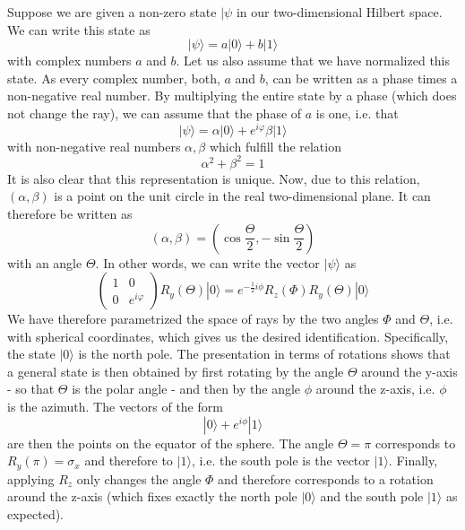 \documentclass[a4paper, draft]{article}
\theoremstyle{own}
\theoremstyle{remark}
\begin{document}
Suppose we are given a non-zero state $|\psi$ in our two-dimensional Hilbert space. We can write this state as
$$
|\psi \rangle = a |0 \rangle + b |1 \rangle
$$
with complex numbers $a$ and $b$. Let us also assume that we have normalized this state. As every complex number, both, $a$ and $b$, can be written as a phase times a non-negative real number. By multiplying the entire state by a phase (which does not change the ray), we can assume that the phase of $a$ is one, i.e. that
$$
|\psi \rangle = \alpha |0 \rangle + e^{i\varphi} \beta |1 \rangle
$$
with non-negative real numbers $\alpha, \beta$ which fulfill the relation
$$
\alpha^2 + \beta^2 = 1
$$
It is also clear that this representation is unique. Now, due to this relation, $(\alpha, \beta)$ is a point on the unit circle in the real two-dimensional plane. It can therefore be written as
$$
(\alpha, \beta) = (\cos \frac{\Theta}{2}, - \sin \frac{\Theta}{2})
$$
with an angle $\Theta$. In other words, we can write the vector $|\psi \rangle$ as
$$
\begin{pmatrix} 1 & 0 \\ 0 & e^{i\varphi} \end{pmatrix} R_y(\Theta) |0 \rangle
=
e^{-\frac{1}{2} i \phi} R_z(\Phi) R_y(\Theta) |0 \rangle
$$
We have therefore parametrized the space of rays by the two angles $\Phi$ and $\Theta$, i.e. with spherical coordinates, which gives us the desired identification. Specifically, the state $|0 \rangle$ is the north pole. The presentation in terms of rotations shows that a general state is then obtained by first rotating by the angle $\Theta$ around the y-axis - so that $\Theta$ is the polar angle - and then by the angle $\phi$ around the z-axis, i.e. $\phi$ is the azimuth. The vectors of the form
$$
|0 \rangle + e^{i\phi} |1 \rangle
$$
are then the points on the equator of the sphere. The angle $\Theta = \pi$ corresponds to $R_y(\pi) = \sigma_x$ and therefore to $|1 \rangle$, i.e. the south pole is the vector $|1 \rangle$. Finally, applying $R_z$ only changes the angle $\Phi$ and therefore corresponds to a rotation around the z-axis (which fixes exactly the north pole $|0 \rangle$ and the south pole $|1 \rangle$ as expected).
\end{document}
